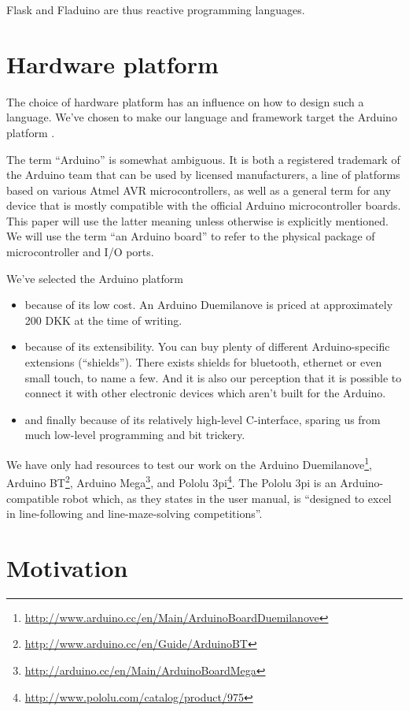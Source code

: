\documentclass[a4paper, oneside, final]{memoir}
\begin{document}
Flask and Fladuino are thus reactive programming languages.


\section{Hardware platform}
\label{sec:hardware platform}
The choice of hardware platform has an influence on how to design such
a language. We've chosen to make our language and framework target the
Arduino platform \cite{arduino}.

The term ``Arduino'' is somewhat ambiguous.  It is both a registered
trademark of the Arduino team that can be used by licensed
manufacturers, a line of platforms based on various Atmel AVR
microcontrollers, as well as a general term for any device that is
mostly compatible with the official Arduino microcontroller boards.
This paper will use the latter meaning unless otherwise is explicitly
mentioned.  We will use the term ``an Arduino board'' to refer to the
physical package of microcontroller and I/O ports.

\noindent
We've selected the Arduino platform 
\begin{itemize}
\item because of its low cost. An Arduino Duemilanove is priced at
  approximately 200 \nolinebreak DKK at the time of writing.
\item because of its extensibility. You can buy plenty of different
  Arduino-specific extensions (``shields''). There exists shields for
  bluetooth, ethernet or even small touch, to name a few. And it is also
  our perception that it is possible to connect it with other
  electronic devices which aren't built for the Arduino.
\item and finally because of its relatively high-level C-interface,
  sparing us from much low-level programming and bit trickery.
\end{itemize}

We have only had resources to test our work on the Arduino
Duemilanove\footnote{\url{http://www.arduino.cc/en/Main/ArduinoBoardDuemilanove}},
Arduino BT\footnote{\url{http://www.arduino.cc/en/Guide/ArduinoBT}},
Arduino
Mega\footnote{\url{http://arduino.cc/en/Main/ArduinoBoardMega}}, and
Pololu 3pi\footnote{\url{http://www.pololu.com/catalog/product/975}}.
The Pololu 3pi is an Arduino-compatible robot which, as they states in
the user manual, is ``designed to excel in line-following and
line-maze-solving competitions''.


\section{Motivation}
\label{sec:motivation}
\end{document}
